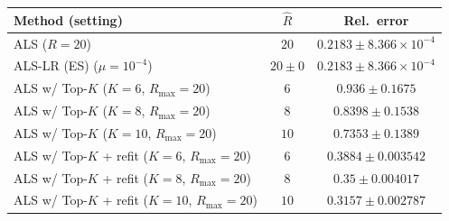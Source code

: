 \begin{longtable}{@{}lcc@{}}
\toprule
Method (setting) & \(\hat R\) & Rel.\ error \\
\midrule
\endhead
ALS (\(R=20\)) & \(20\) & \(0.2183 \pm 8.366{\times}10^{-4}\) \\
ALS-LR (ES) (\(\mu=10^{-4}\)) & \(20 \pm 0\) & \(0.2183 \pm 8.366{\times}10^{-4}\) \\
ALS w/ Top-\(K\) (\(K=6\), \(R_{\max}=20\)) & \(6\) & \(0.936 \pm 0.1675\) \\
ALS w/ Top-\(K\) (\(K=8\), \(R_{\max}=20\)) & \(8\) & \(0.8398 \pm 0.1538\) \\
ALS w/ Top-\(K\) (\(K=10\), \(R_{\max}=20\)) & \(10\) & \(0.7353 \pm 0.1389\) \\
ALS w/ Top-\(K\) + refit (\(K=6\), \(R_{\max}=20\)) & \(6\) & \(0.3884 \pm 0.003542\) \\
ALS w/ Top-\(K\) + refit (\(K=8\), \(R_{\max}=20\)) & \(8\) & \(0.35 \pm 0.004017\) \\
ALS w/ Top-\(K\) + refit (\(K=10\), \(R_{\max}=20\)) & \(10\) & \(0.3157 \pm 0.002787\) \\
\bottomrule
\end{longtable}
